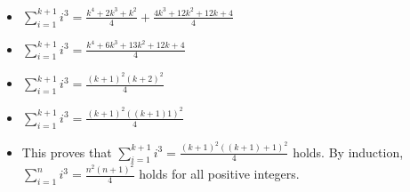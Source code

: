 \documentclass{article}
\begin{document}
\begin{enumerate}
\begin{itemize}
    \item {\Large $\sum\limits_{i=1}^{k+1}i^{3}=\frac{k^{4}+2k^{3}+k^{2}}{4} + \frac{4k^{3}+12k^{2}+12k+4}{4}$}
    \item {\Large $\sum\limits_{i=1}^{k+1}i^{3}=\frac{k^{4}+6k^{3}+13k^{2}+12k+4}{4}$}
    \item {\Large $\sum\limits_{i=1}^{k+1}i^{3}=\frac{(k+1)^{2}(k+2)^{2}}{4}$}
    \item {\Large $\sum\limits_{i=1}^{k+1}i^{3}=\frac{(k+1)^{2}((k+1)1)^{2}}{4}$}
    \item This proves that {\Large $\sum\limits_{i=1}^{k+1}i^{3}=\frac{(k+1)^{2}((k+1)+1)^{2}}{4}$} holds. By induction, {\Large $\sum\limits_{i=1}^{n}i^{3}=\frac{n^{2}(n+1)^{2}}{4}$} holds for all positive integers.
    \end{itemize}


\end{enumerate}
\end{document}
